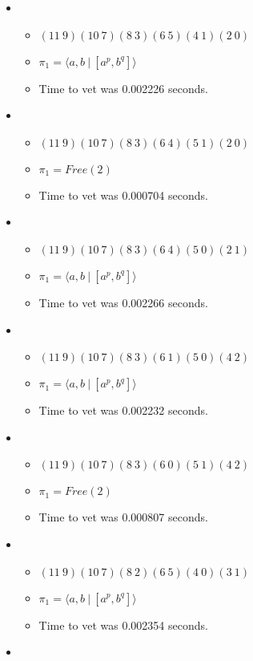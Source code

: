 \documentclass{article}
\begin{document}
\begin{itemize}
\begin{itemize}
\end{itemize}
\item \begin{itemize}
      \item $(11\ 9)(10\ 7)(8\ 3)(6\ 5)(4\ 1)(2\ 0)$
      \item $\pi_1 = \langle a,b\ |\ [a^p,b^q]\rangle$
      \item Time to vet was 0.002226 seconds.
\end{itemize}
\item \begin{itemize}
      \item $(11\ 9)(10\ 7)(8\ 3)(6\ 4)(5\ 1)(2\ 0)$
      \item $\pi_1 =Free(2)$
      \item Time to vet was 0.000704 seconds.
\end{itemize}
\item \begin{itemize}
      \item $(11\ 9)(10\ 7)(8\ 3)(6\ 4)(5\ 0)(2\ 1)$
      \item $\pi_1 = \langle a,b\ |\ [a^p,b^q]\rangle$
      \item Time to vet was 0.002266 seconds.
\end{itemize}
\item \begin{itemize}
      \item $(11\ 9)(10\ 7)(8\ 3)(6\ 1)(5\ 0)(4\ 2)$
      \item $\pi_1 = \langle a,b\ |\ [a^p,b^q]\rangle$
      \item Time to vet was 0.002232 seconds.
\end{itemize}
\item \begin{itemize}
      \item $(11\ 9)(10\ 7)(8\ 3)(6\ 0)(5\ 1)(4\ 2)$
      \item $\pi_1 =Free(2)$
      \item Time to vet was 0.000807 seconds.
\end{itemize}
\item \begin{itemize}
      \item $(11\ 9)(10\ 7)(8\ 2)(6\ 5)(4\ 0)(3\ 1)$
      \item $\pi_1 = \langle a,b\ |\ [a^p,b^q]\rangle$
      \item Time to vet was 0.002354 seconds.
\end{itemize}
\item \begin{itemize}

\end{itemize}
\end{itemize}
\end{document}
